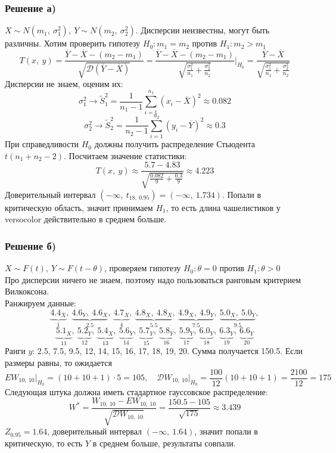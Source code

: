 \documentclass[12pt, a4paper]{article}
\newcommand{\dev}{\mathcal{D}}
\begin{document}
\subsubsection*{Решение а)}
$X \sim N(m_1,\ \sigma^2_1),\ Y \sim N(m_2,\ \sigma^2_2)$. Дисперсии неизвестны, могут быть различны. Хотим проверить гипотезу $H_0: m_1 = m_2$ против $H_1: m_2 > m_1$
\[T(x,\ y) = \frac{\overline{Y} - \overline{X} - (m_2 - m_1)}{\sqrt{\dev\left( \overline{Y} - \overline{X} \right)}} = \frac{\overline{Y} - \overline{X} - (m_2 - m_1)}{\sqrt{\frac{\sigma_1^2}{n_1} + \frac{\sigma_2^2}{n_2}}}\Bigg|_{H_0} = \frac{\overline{Y} - \overline{X}}{\sqrt{\frac{\sigma_1^2}{n_1} + \frac{\sigma_2^2}{n_2}}}\]
Дисперсии не знаем, оценим их:
\[\sigma_1^2 \to \tilde S^2_1 = \frac{1}{n_1 - 1} \sum_{i = 1}^{n_1} {\left( x_i - \overline{X} \right)}^2 \approx 0.082\]
\[\sigma_2^2 \to \tilde S^2_2 = \frac{1}{n_2 - 1} \sum_{i = 1}^{n_2} {\left( y_i - \overline{Y} \right)}^2 \approx 0.3\]
При справедливости $H_0$ должны получить распределение Стьюдента $t(n_1 + n_2 - 2)$. Посчитаем значение статистики:
\[T(x,\ y) \approx \frac{5.7 - 4.83}{\sqrt{\frac{0.082}{9} + \frac{0.3}{9}}} \approx 4.223\]
Доверительный интервал $(-\infty,\ t_{18,\ 0.95}) = (-\infty,\ 1.734)$. Попали в критическую область, значит принимаем $H_1$, то есть длина чашелистиков у versocolor действительно в среднем больше.
\subsubsection*{Решение б)}
$X\sim F(t),\ Y\sim F(t - \theta)$, проверяем гипотезу $H_0: \theta = 0$ против $H_1: \theta > 0$\\
Про дисперсии ничего не знаем, поэтому надо пользоваться ранговым критерием Вилкоксона.\\
Ранжируем данные:
\[\underset{1}{\underbrace{4.4_X}},\ \underset{2.5}{\underbrace{4.6_Y,\ 4.6_X}},\ \underset{4}{\underbrace{4.7_X}},\ \underset{5.5}{\underbrace{4.8_X,\ 4.8_X}},\ \underset{7.5}{\underbrace{4.9_X,\ 4.9_Y}},\ \underset{9.5}{\underbrace{5.0_X,\ 5.0_Y}},\]
\[\underset{11}{\underbrace{5.1_X}},\ \underset{12}{\underbrace{5.2_Y}},\ \underset{13}{\underbrace{5.4_X}},\ \underset{14}{\underbrace{5.6_Y}},\ \underset{15}{\underbrace{5.7_Y}},\ \underset{16}{\underbrace{5.8_Y}},\ \underset{17}{\underbrace{5.9_Y}},\ \underset{18}{\underbrace{6.0_Y}},\ \underset{19}{\underbrace{6.3_Y}},\ \underset{20}{\underbrace{6.6_Y}}\]
Ранги $y$: 2.5, 7.5, 9.5, 12, 14, 15, 16, 17, 18, 19, 20. Сумма получается 150.5. Если размеры равны, то ожидается
\[EW_{10,\ 10}\Big|_{H_0} = (10 + 10 + 1)\cdot 5 = 105,\quad \dev W_{10,\ 10}\Big|_{H_0} = \frac{100}{12}(10 + 10 + 1) = \frac{2100}{12} = 175\]
Следующая штука должна иметь стадартное гауссовское распределение:
\[W^* = \frac{W_{10,\ 10} - EW_{10,\ 10}}{\sqrt{\dev W_{10,\ 10}}} = \frac{150.5 - 105}{\sqrt{175}} \approx 3.439\]
$Z_{0.95} = 1.64$, доверительный интервал $(-\infty,\ 1.64)$, значит попали в критическую, то есть $Y$ в среднем больше, результаты совпали.
\end{document}
